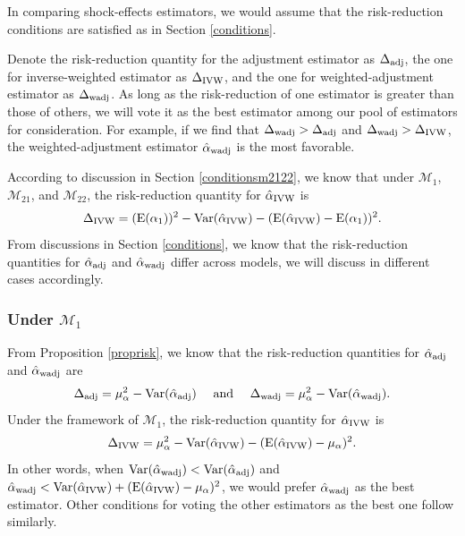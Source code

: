 \documentclass[11pt]{article}
\def\mc#1{\mathcal{#1}} %
\def\E#1{\mathrm{E}(#1)} %
\def\var#1{\mathrm{Var}(#1)} %
\theoremstyle{definition}
\begin{document}
\label{comparisons}

In comparing  shock-effects estimators, we would assume that the risk-reduction conditions are satisfied as in Section \ref{conditions}.  

Denote the risk-reduction quantity for the adjustment estimator as $\Delta_{\rm adj}$, the one for inverse-weighted estimator as $\Delta_{\rm IVW}$, and the one for weighted-adjustment estimator as $\Delta_{\rm wadj}$. As long as the risk-reduction of one estimator is greater than those of others, we will vote it as the best estimator among our pool of estimators for consideration. For example, if we find that $\Delta_{\rm wadj}>\Delta_{\rm adj}$ and $\Delta_{\rm wadj}>\Delta_{\rm IVW}$, the weighted-adjustment estimator $\hat{\alpha}_{\rm wadj}$ is the most favorable.


According to  discussion in Section \ref{conditionsm2122}, we know that under $\mc{M}_{1}$, $\mc{M}_{21}$, and $\mc{M}_{22}$, the risk-reduction quantity for $\hat{\alpha}_{\rm IVW}$ is
\begin{align*}
  \Delta_{\rm IVW} = (\E{\alpha_1})^2- \var{\hat{\alpha}_{\rm IVW}} -(\E{\hat{\alpha}_{\rm IVW}}-\E{\alpha_1})^2.
\end{align*}
From discussions in Section \ref{conditions}, we know that the risk-reduction quantities for $\hat{\alpha}_{\rm adj}$ and $\hat{\alpha}_{\rm wadj}$ differ across models, we will discuss in different cases accordingly.


\subsubsection{Under $\mc{M}_{1}$}

From Proposition \ref{proprisk}, we know that the risk-reduction quantities for $\hat{\alpha}_{\rm adj}$ and $\hat{\alpha}_{\rm wadj}$ are
\begin{align*}
  \Delta_{\rm adj} 
  = \mu_{\alpha}^2 -\var{\hat{\alpha}_{\rm adj}}
\quad   \text{ and } \quad 
  \Delta_{\rm wadj} 
  = \mu_{\alpha}^2-\var{\hat{\alpha}_{\rm wadj}}.
\end{align*}
Under the framework of $\mc{M}_1$, the risk-reduction quantity  for $\hat{\alpha}_{\rm IVW}$ is
\begin{align*}
  \Delta_{\rm IVW} = \mu_{\alpha}^2- \var{\hat{\alpha}_{\rm IVW}} -(\E{\hat{\alpha}_{\rm IVW}}-\mu_{\alpha})^2.
\end{align*}
In other words, when $\var{\hat{\alpha}_{\rm wadj}}<\var{\hat{\alpha}_{\rm adj}}$ and $\hat{\alpha}_{\rm wadj} < \var{\hat{\alpha}_{\rm IVW}} +(\E{\hat{\alpha}_{\rm IVW}}-\mu_{\alpha})^2$, we would prefer $\hat{\alpha}_{\rm wadj}$ as the best estimator. Other conditions for voting the other estimators as the best one follow similarly. 
\end{document}
